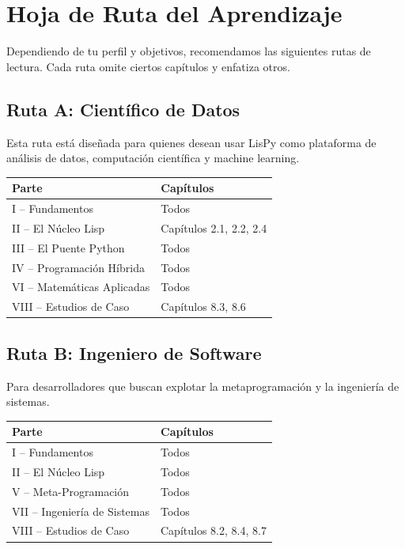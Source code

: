 \chapter{Hoja de Ruta del Aprendizaje}
\label{chap:roadmap}

Dependiendo de tu perfil y objetivos, recomendamos las siguientes rutas de
lectura. Cada ruta omite ciertos capítulos y enfatiza otros.

\section{Ruta A: Científico de Datos}

Esta ruta está diseñada para quienes desean usar LisPy como plataforma de
análisis de datos, computación científica y machine learning.

\begin{center}
\begin{tabular}{ll}
\toprule
\textbf{Parte} & \textbf{Capítulos} \\
\midrule
I -- Fundamentos & Todos \\
II -- El Núcleo Lisp & Capítulos 2.1, 2.2, 2.4 \\
III -- El Puente Python & Todos \\
IV -- Programación Híbrida & Todos \\
VI -- Matemáticas Aplicadas & Todos \\
VIII -- Estudios de Caso & Capítulos 8.3, 8.6 \\
\bottomrule
\end{tabular}
\end{center}

\section{Ruta B: Ingeniero de Software}

Para desarrolladores que buscan explotar la metaprogramación y la ingeniería
de sistemas.

\begin{center}
\begin{tabular}{ll}
\toprule
\textbf{Parte} & \textbf{Capítulos} \\
\midrule
I -- Fundamentos & Todos \\
II -- El Núcleo Lisp & Todos \\
V -- Meta-Programación & Todos \\
VII -- Ingeniería de Sistemas & Todos \\
VIII -- Estudios de Caso & Capítulos 8.2, 8.4, 8.7 \\
\bottomrule
\end{tabular}
\end{center}

